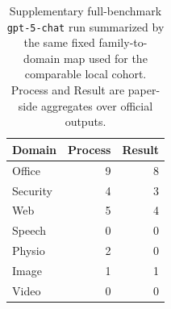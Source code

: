 \begin{table}[t]
\caption{Supplementary full-benchmark \texttt{gpt-5-chat} run summarized by the same fixed family-to-domain map used for the comparable local cohort. Process and Result are paper-side aggregates over official outputs.}
\label{tab:provider-full54-domain}
\centering
\small
\begin{tabular}{lrr}
\toprule
\rowcolor{cyan!12}
Domain & Process & Result \\
\midrule
\rowcolors{2}{cyan!4}{white}
Office & 9 & 8 \\
Security & 4 & 3 \\
Web & 5 & 4 \\
Speech & 0 & 0 \\
Physio & 2 & 0 \\
Image & 1 & 1 \\
Video & 0 & 0 \\
\bottomrule
\end{tabular}
\end{table}
